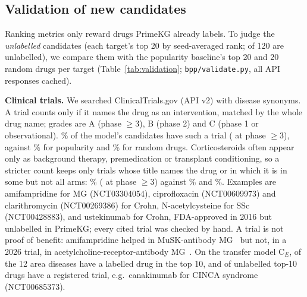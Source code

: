 \documentclass{ieeeaccess}
\newcommand{\sysname}{BioPathNet++\xspace}
\begin{document}
\begin{table}[!t]
\centering
\caption{Highest-scoring explanation path for four predictions (seed 0); edge labels are PrimeKG relations ($^{-1}$: inverse direction).}
\label{tab:paths}
\scriptsize

\end{table}

\subsection{Validation of new candidates}
\label{sec:validation}
Ranking metrics only reward drugs PrimeKG already labels. To judge the \emph{unlabelled} candidates (each target's top 20 by seed-averaged rank; \ValNovelN{} of 120 are unlabelled), we compare them with the popularity baseline's top 20 and 20 random drugs per target (Table~\ref{tab:validation}; \texttt{bpp/validate.py}, all API responses cached).

\begin{table}[!t]
\centering
\caption{Evidence for unlabelled candidates: \sysname{} top-20 (Ours, $n$=\ValNovelN) vs.\ popularity top-20 (Pop., $n$=120) vs.\ 20 random drugs per target ($n$=120). Trial grades: A phase $\geq$3, B phase 2, C phase 1 or observational.}
\label{tab:validation}
\scriptsize
\setlength{\tabcolsep}{2.5pt}

\end{table}

\textbf{Clinical trials.} We searched ClinicalTrials.gov (API v2) with disease synonyms. A trial counts only if it names the drug as an intervention, matched by the whole drug name; grades are A (phase $\geq$3), B (phase 2) and C (phase 1 or observational). \ValTrialModel\% of the model's candidates have such a trial (\ValGradeA{} at phase $\geq$3), against \ValTrialPop\% for popularity and \ValTrialRand\% for random drugs. Corticosteroids often appear only as background therapy, premedication or transplant conditioning, so a stricter count keeps only trials whose title names the drug or in which it is in some but not all arms: \ValTrialTestedModel\% (\ValGradeATested{} at phase $\geq$3) against \ValTrialTestedPop\% and \ValTrialTestedRand\%. Examples are amifampridine for MG (NCT03304054), ciprofloxacin (NCT00609973) and clarithromycin (NCT00269386) for Crohn, N-acetylcysteine for SSc (NCT00428883), and ustekinumab for Crohn, FDA-approved in 2016 but unlabelled in PrimeKG; every cited trial was checked by hand. A trial is not proof of benefit: amifampridine helped in MuSK-antibody MG~\cite{bonanno2018amifampridine} but not, in a 2026 trial, in acetylcholine-receptor-antibody MG~\cite{remijn2026amifampridine}. On the transfer model C$_E$, \EcheckDiseases{} of the 12 area diseases have a labelled drug in the top 10, and \EcheckNovelTrial{} of \EcheckNovel{} unlabelled top-10 drugs have a registered trial, e.g.\ canakinumab for CINCA syndrome (NCT00685373).
\end{document}
